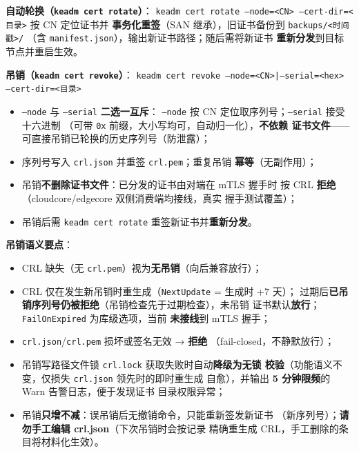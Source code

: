 \textbf{自动轮换（\texttt{keadm cert rotate}）}：
\texttt{keadm cert rotate --node=<CN> --cert-dir=<目录>} 按 CN 定位证书并
\textbf{事务化重签}（SAN 继承），旧证书备份到 \texttt{backups/<时间戳>/}
（含 \texttt{manifest.json}），输出新证书路径；随后需将新证书
\textbf{重新分发}到目标节点并重启生效。

\textbf{吊销（\texttt{keadm cert revoke}）}：
\texttt{keadm cert revoke --node=<CN>|--serial=<hex> --cert-dir=<目录>}

\begin{itemize}
  \item \texttt{--node} 与 \texttt{--serial} \textbf{二选一互斥}：
        \texttt{--node} 按 CN 定位取序列号；\texttt{--serial} 接受十六进制
        （可带 \texttt{0x} 前缀，大小写均可，自动归一化），\textbf{不依赖
        证书文件}——可直接吊销已轮换的历史序列号（防泄露）；
  \item 序列号写入 \texttt{crl.json} 并重签 \texttt{crl.pem}；重复吊销
        \textbf{幂等}（无副作用）；
  \item 吊销\textbf{不删除证书文件}：已分发的证书由对端在 mTLS 握手时
        按 CRL \textbf{拒绝}（cloudcore/edgecore 双侧消费端均接线，真实
        握手测试覆盖）；
  \item 吊销后需 \texttt{keadm cert rotate} 重签新证书并\textbf{重新分发}。
\end{itemize}

\textbf{吊销语义要点}：

\begin{itemize}
  \item CRL 缺失（无 \texttt{crl.pem}）视为\textbf{无吊销}（向后兼容放行）；
  \item CRL 仅在发生新吊销时重生成（\texttt{NextUpdate} = 生成时 +7 天）；
        过期后\textbf{已吊销序列号仍被拒绝}（吊销检查先于过期检查），未吊销
        证书默认\textbf{放行}；\texttt{FailOnExpired} 为库级选项，当前
        \textbf{未接线}到 mTLS 握手；
  \item \texttt{crl.json}/\texttt{crl.pem} 损坏或签名无效 → \textbf{拒绝}
        （fail-closed，不静默放行）；
  \item 吊销写路径文件锁 \texttt{crl.lock} 获取失败时自动\textbf{降级为无锁
        校验}（功能语义不变，仅损失 \texttt{crl.json} 领先时的即时重生成
        自愈），并输出 \textbf{5 分钟限频}的 Warn 告警日志，便于发现证书
        目录权限异常；
  \item 吊销\textbf{只增不减}：误吊销后无撤销命令，只能重新签发新证书
        （新序列号）；\textbf{请勿手工编辑 crl.json}（下次吊销时会按记录
        精确重生成 CRL，手工删除的条目将材料化生效）。
\end{itemize}

